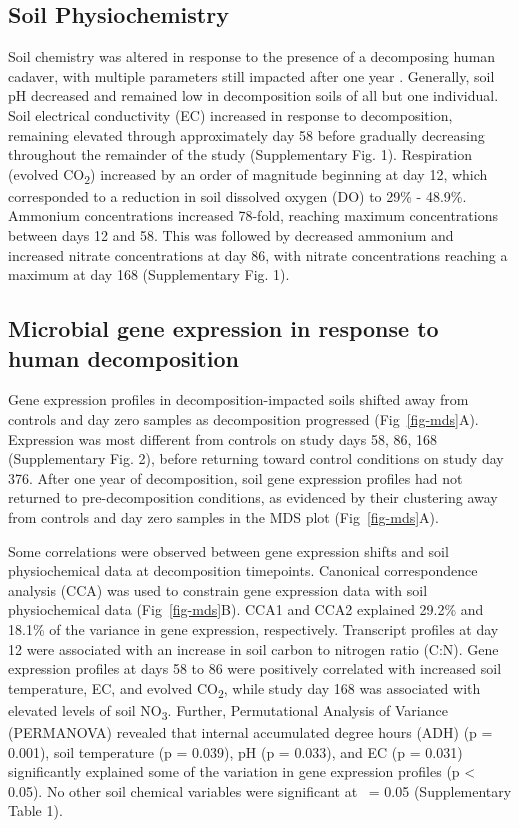 \documentclass[
  sn-nature,
  lineno, referee]{sn-jnl}
\begin{document}
\subsection{Soil Physiochemistry}\label{soil-physiochemistry}

Soil chemistry was altered in response to the presence of a decomposing
human cadaver, with multiple parameters still impacted after one year
\citep{taylor_transient_2024}. Generally, soil pH decreased and remained
low in decomposition soils of all but one individual. Soil electrical
conductivity (EC) increased in response to decomposition, remaining
elevated through approximately day 58 before gradually decreasing
throughout the remainder of the study (Supplementary Fig. 1).
Respiration (evolved CO\textsubscript{2}) increased by an order of
magnitude beginning at day 12, which corresponded to a reduction in soil
dissolved oxygen (DO) to 29\% - 48.9\%. Ammonium concentrations
increased 78-fold, reaching maximum concentrations between days 12 and
58. This was followed by decreased ammonium and increased nitrate
concentrations at day 86, with nitrate concentrations reaching a maximum
at day 168 (Supplementary Fig. 1).

\subsection{Microbial gene expression in response to human
decomposition}\label{microbial-gene-expression-in-response-to-human-decomposition}

Gene expression profiles in decomposition-impacted soils shifted away
from controls and day zero samples as decomposition progressed
(Fig~\ref{fig-mds}A). Expression was most different from controls on
study days 58, 86, 168 (Supplementary Fig. 2), before returning toward
control conditions on study day 376. After one year of decomposition,
soil gene expression profiles had not returned to pre-decomposition
conditions, as evidenced by their clustering away from controls and day
zero samples in the MDS plot (Fig~\ref{fig-mds}A).

Some correlations were observed between gene expression shifts and soil
physiochemical data at decomposition timepoints. Canonical
correspondence analysis (CCA) was used to constrain gene expression data
with soil physiochemical data (Fig~\ref{fig-mds}B). CCA1 and CCA2
explained 29.2\% and 18.1\% of the variance in gene expression,
respectively. Transcript profiles at day 12 were associated with an
increase in soil carbon to nitrogen ratio (C:N). Gene expression
profiles at days 58 to 86 were positively correlated with increased soil
temperature, EC, and evolved CO\textsubscript{2}, while study day 168
was associated with elevated levels of soil NO\textsubscript{3}.
Further, Permutational Analysis of Variance (PERMANOVA) revealed that
internal accumulated degree hours (ADH) (p = 0.001), soil temperature (p
= 0.039), pH (p = 0.033), and EC (p = 0.031) significantly explained
some of the variation in gene expression profiles (p \textless{} 0.05).
No other soil chemical variables were significant at \textalpha~= 0.05
(Supplementary Table 1).
\end{document}

